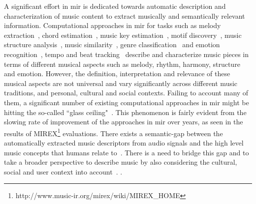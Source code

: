 A significant effort in \gls{mir} is dedicated towards automatic description and characterization of music content to extract musically and semantically relevant information. Computational approaches in \gls{mir} for tasks such as melody extraction~\citep{salamon:phd:13}, chord estimation~\citep{mcvicar2014automatic}, music key estimation~\citep{peeters2006chroma}, motif discovery~\citep{collins2011improved,Conklin2010}, music structure analysis~\citep{paulus2010state,serra2012unsupervised}, music similarity~\citep{joan_thesis}, genre classification~\cite{aucouturier2003representing} and emotion recognition~\citep{kim2010music}, tempo and beat tracking~\citep{gouyon2005review,scheirer1998tempo} describe and characterize music pieces in terms of different musical aspects such as melody, rhythm, harmony, structure and emotion. However, the definition, interpretation and relevance of these musical aspects are not universal and vary significantly across different music traditions,  and personal, cultural and social contexts.  Failing to account many of them, a significant number of existing computational approaches in \gls{mir} might be hitting the so-called ``glass ceiling"~\citep{pachet2004improving,casey2008content}. This phenomenon is fairly evident from the slowing rate of improvement of the approaches in \gls{mir} over years, as seen in the results of MIREX\footnote{http://www.music-ir.org/mirex/wiki/MIREX\_HOME} evaluations. There exists a semantic-gap between the automatically extracted music descriptors from audio signals and the high level music concepts that humans relate to~\citep{celma2006foafing,casey2008content}. There is a need to bridge this gap and to take a broader perspective to describe music by also considering the cultural, social and user context into account~\citep{roadmap_mir}. .

